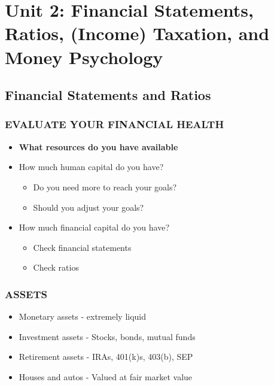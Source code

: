 \documentclass[12pt]{article}
\begin{document}
    \section{Unit 2: Financial Statements, Ratios, (Income) Taxation, and Money Psychology}
    
        \subsection{Financial Statements and Ratios}
            \subsubsection{EVALUATE YOUR FINANCIAL HEALTH}
                \begin{itemize}
                    \item \textbf{What resources do you have available}
                    \item How much human capital do you have?
                        \begin{itemize}
                            \item Do you need more to reach your goals?
                            \item Should you adjust your goals?
                        \end{itemize}
                    \item How much financial capital do you have?
                        \begin{itemize}
                            \item Check financial statements
                            \item Check ratios
                        \end{itemize}
                \end{itemize}
            \subsubsection{ASSETS}
                \begin{itemize}
                    \item Monetary assets - extremely liquid
                    \item Investment assets - Stocks, bonds, mutual funds
                    \item Retirement assets - IRAs, 401(k)s, 403(b), SEP
                    \item Houses and autos - Valued at fair market value
                \end{itemize}
\end{document}
